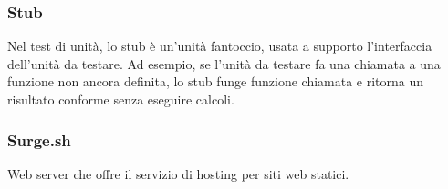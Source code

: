 \subsubsection*{Stub}
Nel test di unità, lo stub è un'unità fantoccio, usata a supporto l'interfaccia dell'unità da testare. Ad esempio, se l'unità da testare fa una chiamata a una funzione non ancora definita, lo stub funge funzione chiamata e ritorna un risultato conforme senza eseguire calcoli.

\subsubsection*{Surge.sh}
Web server che offre il servizio di hosting per siti web statici.

